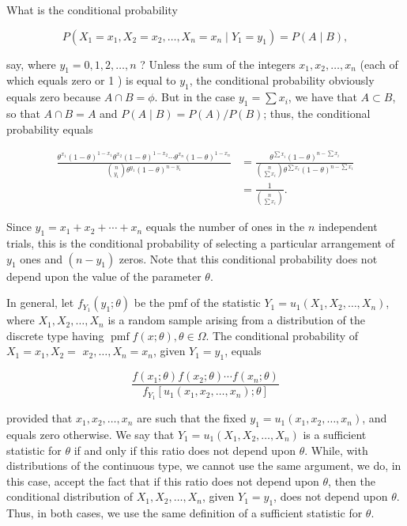 What is the conditional probability

$$
P\left(X_{1}=x_{1}, X_{2}=x_{2}, \ldots, X_{n}=x_{n} \mid Y_{1}=y_{1}\right)=P(A \mid B),
$$

say, where $y_{1}=0,1,2, \ldots, n$ ? Unless the sum of the integers $x_{1}, x_{2}, \ldots, x_{n}$ (each of which equals zero or 1 ) is equal to $y_{1}$, the conditional probability obviously equals zero because $A \cap B=\phi$. But in the case $y_{1}=\sum x_{i}$, we have that $A \subset B$, so that $A \cap B=A$ and $P(A \mid B)=P(A) / P(B)$; thus, the conditional probability equals

$$
\begin{aligned}
\frac{\theta^{x_{1}}(1-\theta)^{1-x_{1}} \theta^{x_{2}}(1-\theta)^{1-x_{2}} \cdots \theta^{x_{n}}(1-\theta)^{1-x_{n}}}{\binom{n}{y_{1}} \theta^{y_{1}}(1-\theta)^{n-y_{1}}} & =\frac{\theta^{\sum x_{i}}(1-\theta)^{n-\sum x_{i}}}{\binom{n}{\sum x_{i}} \theta^{\sum x_{i}}(1-\theta)^{n-\sum x_{i}}} \\
& =\frac{1}{\binom{n}{\sum x_{i}}} .
\end{aligned}
$$

Since $y_{1}=x_{1}+x_{2}+\cdots+x_{n}$ equals the number of ones in the $n$ independent trials, this is the conditional probability of selecting a particular arrangement of $y_{1}$ ones and $\left(n-y_{1}\right)$ zeros. Note that this conditional probability does not depend upon the value of the parameter $\theta$.

In general, let $f_{Y_{1}}\left(y_{1} ; \theta\right)$ be the pmf of the statistic $Y_{1}=u_{1}\left(X_{1}, X_{2}, \ldots, X_{n}\right)$, where $X_{1}, X_{2}, \ldots, X_{n}$ is a random sample arising from a distribution of the discrete type having $\operatorname{pmf} f(x ; \theta), \theta \in \Omega$. The conditional probability of $X_{1}=x_{1}, X_{2}=$ $x_{2}, \ldots, X_{n}=x_{n}$, given $Y_{1}=y_{1}$, equals

$$
\frac{f\left(x_{1} ; \theta\right) f\left(x_{2} ; \theta\right) \cdots f\left(x_{n} ; \theta\right)}{f_{Y_{1}}\left[u_{1}\left(x_{1}, x_{2}, \ldots, x_{n}\right) ; \theta\right]}
$$

provided that $x_{1}, x_{2}, \ldots, x_{n}$ are such that the fixed $y_{1}=u_{1}\left(x_{1}, x_{2}, \ldots, x_{n}\right)$, and equals zero otherwise. We say that $Y_{1}=u_{1}\left(X_{1}, X_{2}, \ldots, X_{n}\right)$ is a sufficient statistic for $\theta$ if and only if this ratio does not depend upon $\theta$. While, with distributions of the continuous type, we cannot use the same argument, we do, in this case, accept the fact that if this ratio does not depend upon $\theta$, then the conditional distribution of $X_{1}, X_{2}, \ldots, X_{n}$, given $Y_{1}=y_{1}$, does not depend upon $\theta$. Thus, in both cases, we use the same definition of a sufficient statistic for $\theta$.

